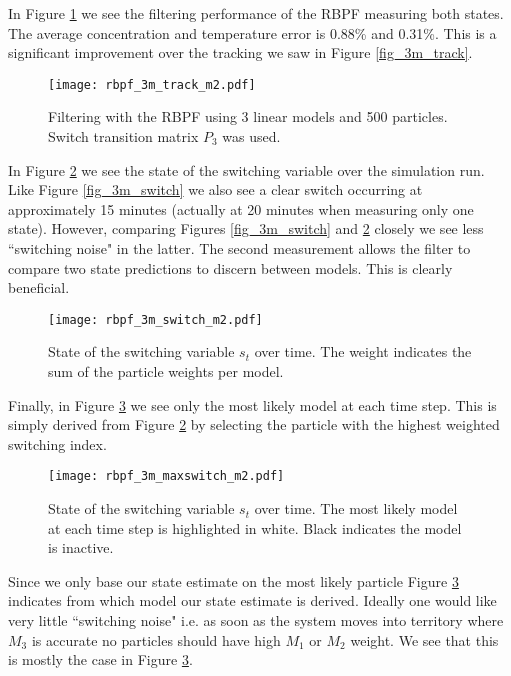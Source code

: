 In Figure \ref{fig_3m_track_m2} we see the filtering performance of the RBPF measuring both states. The average concentration and temperature error is 0.88\% and 0.31\%. This is a significant improvement over the tracking we saw in Figure \ref{fig_3m_track}.
\begin{figure}[H] 
\centering
\texttt{[image: rbpf\_3m\_track\_m2.pdf]}
\caption{Filtering with the RBPF using 3 linear models and 500 particles. Switch transition matrix $P_3$ was used.}
\label{fig_3m_track_m2}
\end{figure}
In Figure \ref{fig_3m_switch_m2} we see the state of the switching variable over the simulation run. Like Figure \ref{fig_3m_switch} we also see a clear switch occurring at approximately 15 minutes (actually at 20 minutes when measuring only one state). However, comparing Figures \ref{fig_3m_switch} and \ref{fig_3m_switch_m2} closely we see less ``switching noise" in the latter. The second measurement allows the filter to compare two state predictions to discern between models. This is clearly beneficial.
\begin{figure}[H] 
\centering
\texttt{[image: rbpf\_3m\_switch\_m2.pdf]}
\caption{State of the switching variable $s_t$ over time. The weight indicates the sum of the particle weights per model.}
\label{fig_3m_switch_m2}
\end{figure}
Finally, in Figure \ref{fig_3m_maxswitch} we see only the most likely model at each time step. This is simply derived from Figure \ref{fig_3m_switch_m2} by selecting the particle with the highest weighted switching index.
\begin{figure}[H] 
\centering
\texttt{[image: rbpf\_3m\_maxswitch\_m2.pdf]}
\caption{State of the switching variable $s_t$ over time. The most likely model at each time step is highlighted in white. Black indicates the model is inactive.}
\label{fig_3m_maxswitch}
\end{figure}
Since we only base our state estimate on the most likely particle Figure \ref{fig_3m_maxswitch} indicates from which model our state estimate is derived. Ideally one would like very little ``switching noise" i.e. as soon as the system moves into territory where $M_3$ is accurate no particles should have high $M_1$ or $M_2$ weight. We see that this is mostly the case in Figure \ref{fig_3m_maxswitch}. 